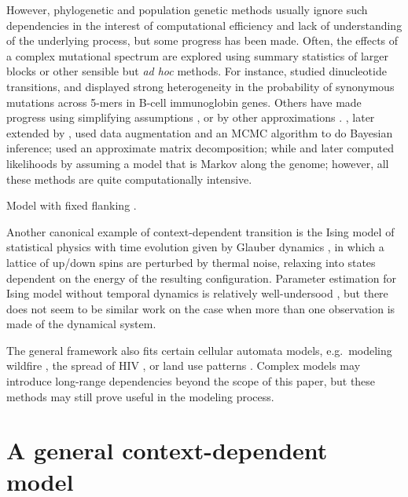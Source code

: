 \documentclass{article}
\theoremstyle{plain}
\theoremstyle{definition}
\begin{document}
However, phylogenetic and population genetic methods usually ignore such dependencies
in the interest of computational efficiency and lack of understanding of the underlying process,
but some progress has been made.
Often, the effects of a complex mutational spectrum are explored using summary statistics of larger blocks or other sensible but \textit{ad hoc} methods.
For instance, \citet{arndt2003sequence} studied dinucleotide transitions,
and \citet{yaari2013models} displayed strong heterogeneity in the probability of synonymous mutations across 5-mers
in B-cell immunoglobin genes.
Others have made progress using simplifying assumptions \citep{berard2012accurate},
or by other approximations \citep{christensen2005pseudolikelihood}.
\citet{pedersen2000dependent}, later extended by
\citet{hobolth2008markov,baele2010using}, used data augmentation and an MCMC algorithm to do Bayesian inference;
\citet{lunter2004nucleotide} used an approximate matrix decomposition;
while \citet{siepel2004phylogenetic} and later \citep{baele2010modelling} computed likelihoods by assuming a model that is Markov along the genome;
however, all these methods are quite computationally intensive.

Model with fixed flanking \citet{saunders2007insights}.

Another canonical example of context-dependent transition is the Ising model of statistical physics
with time evolution given by Glauber dynamics \citep{glauber1963timedependent},
in which a lattice of up/down spins are perturbed by thermal noise,
relaxing into states dependent on the energy of the resulting configuration.
Parameter estimation for Ising model without temporal dynamics
is relatively well-undersood \citep{pickard1982inference,frigessi1990parameter},
but there does not seem to be similar work on the case when more than one observation is made of the dynamical system.

The general framework also fits certain cellular automata models,
e.g.\ modeling wildfire \citep{clarke1994cellular},
the spread of HIV \citep{zorzenondossantos2001dynamics},
or land use patterns \citep{wu2002calibration}.
Complex models may introduce long-range dependencies beyond the scope of this paper,
but these methods may still prove useful in the modeling process.




\section{A general context-dependent model}
\end{document}
